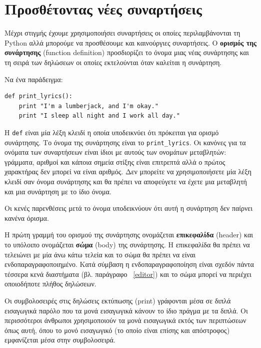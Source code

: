 \documentclass[10pt]{book}
\begin{document}
\section{Προσθέτοντας νέες συναρτήσεις}

Μέχρι στιγμής έχουμε χρησιμοποιήσει συναρτήσεις οι οποίες περιλαμβάνονται
τη Python αλλά μπορούμε να προσθέσουμε και καινούργιες συναρτήσεις.
Ο {\bf ορισμός της συνάρτησης} (function definition) προσδιορίζει το όνομα μιας νέας συνάρτησης
και τη σειρά των δηλώσεων οι οποίες εκτελούνται όταν καλείται η συνάρτηση.


Να ένα παράδειγμα:


\begin{verbatim}
def print_lyrics():
    print "I'm a lumberjack, and I'm okay."
    print "I sleep all night and I work all day."
\end{verbatim}
%

Η {\tt def} είναι μία λέξη κλειδί η οποία υποδεικνύει
ότι πρόκειται για ορισμό συνάρτησης. Το όνομα της συνάρτησης είναι
το  \verb"print_lyrics".  Οι κανόνες για τα ονόματα των συναρτήσεων
είναι ίδιοι με αυτούς των ονομάτων μεταβλητών: γράμματα, αριθμοί και
κάποια σημεία στίξης είναι επιτρεπτά αλλά ο πρώτος χαρακτήρας
δεν μπορεί να είναι αριθμός. Δεν μπορείτε να χρησιμοποιήσετε μία λέξη κλειδί
σαν όνομα συνάρτησης και θα πρέπει να αποφεύγετε να έχετε μια μεταβλητή και
μια συνάρτηση με το ίδιο όνομα.

Οι κενές παρενθέσεις μετά το όνομα υποδεικνύουν ότι αυτή η συνάρτηση
δεν παίρνει κανένα όρισμα.

Η πρώτη γραμμή του ορισμού της συνάρτησης ονομάζεται {\bf επικεφαλίδα}
(header) και το υπόλοιπο ονομάζεται {\bf σώμα} (body) της συνάρτησης. Η επικεφαλίδα θα πρέπει να τελειώνει με μία άνω κάτω τελεία και το σώμα θα 
πρέπει να είναι ενδοπαραγραφοποιημένο. Κατά σύμβαση η ενδοπαραγραφοποίηση 
είναι σχεδόν πάντα τέσσερα κενά διαστήματα (βλ. παράγραφο ~\ref{editor}) 
και το σώμα μπορεί να περιέχει οποιοδήποτε πλήθος δηλώσεων.

Οι συμβολοσειρές στις δηλώσεις εκτύπωσης (print) γράφονται
μέσα σε διπλά εισαγωγικά παρόλο που τα μονά εισαγωγικά κάνουν το ίδιο πράγμα
με τα διπλά. Οι περισσότεροι άνθρωποι χρησιμοποιούν τα μονά εισαγωγικά
εκτός των περιπτώσεων όπως αυτή, όπου το μονό εισαγωγικό (το οποίο είναι
επίσης και απόστροφος) εμφανίζεται μέσα στην συμβολοσειρά.
\end{document}
